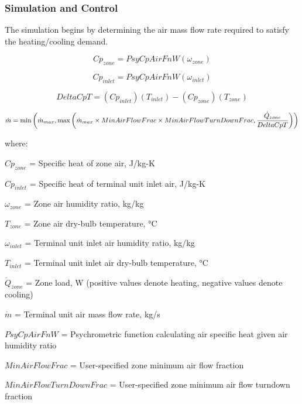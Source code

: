 \subsubsection{Simulation and Control}\label{simulation-and-control}

The simulation begins by determining the air mass flow rate required to satisfy the heating/cooling demand.

\begin{equation}
C{p_{zone}} = PsyCpAirFnW\left( {{\omega_{zone}}} \right)
\end{equation}

\begin{equation}
C{p_{inlet}} = PsyCpAirFnW\left( {{\omega_{inlet}}} \right)
\end{equation}

\begin{equation}
DeltaCpT = \left( {C{p_{inlet}}} \right)\left( {{T_{inlet}}} \right) - \left( {C{p_{zone}}} \right)\left( {{T_{zone}}} \right)
\end{equation}

\begin{equation}
  \dot{m} = \min \left( \dot{m}_{max}, \max \left( \dot{m}_{max}\times MinAirFlowFrac\times MinAirFlowTurnDownFrac,\frac{\dot{Q}_{zone}}{DeltaCpT} \right) \right)
\end{equation}

where:

\(C{p_{zone}}\) = Specific heat of zone air, J/kg-K

\(C{p_{inlet}}\) = Specific heat of terminal unit inlet air, J/kg-K

\({\omega_{zone}}\) = Zone air humidity ratio, kg/kg

\({T_{zone}}\) = Zone air dry-bulb temperature, °C

\({\omega_{inlet}}\) = Terminal unit inlet air humidity ratio, kg/kg

\({T_{inlet}}\) = Terminal unit inlet air dry-bulb temperature, °C

\({\dot Q_{zone}}\) = Zone load, W (positive values denote heating, negative values denote cooling)

\(\dot m\) = Terminal unit air mass flow rate, kg/s

\(PsyCpAirFnW\) = Psychrometric function calculating air specific heat given air humidity ratio

\(MinAirFlowFrac\) = User-specified zone minimum air flow fraction

\(MinAirFlowTurnDownFrac\) = User-specified zone minimum air flow turndown fraction

